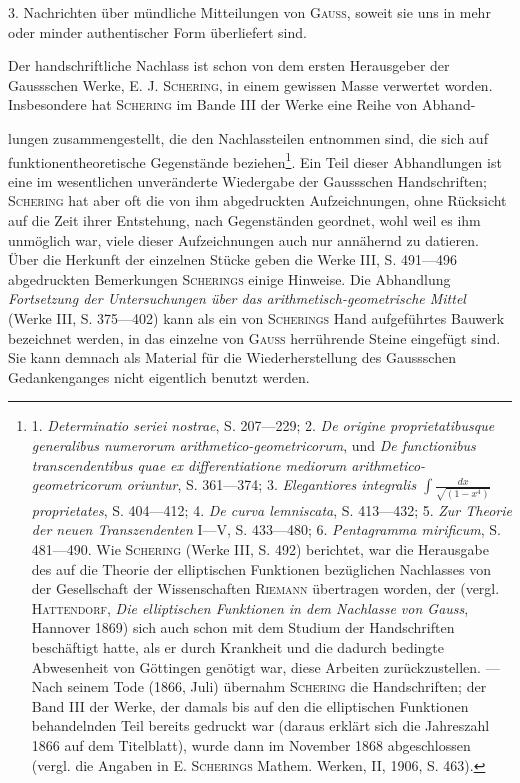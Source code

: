 3. Nachrichten über mündliche Mitteilungen von \textsc{Gauss}, soweit sie uns
in mehr oder minder authentischer Form überliefert sind.

Der handschriftliche Nachlass ist schon von dem ersten Herausgeber der
Gaussschen Werke, E. J. \textsc{Schering}, in einem gewissen Masse verwertet worden.
Insbesondere hat \textsc{Schering} im Bande III der Werke eine Reihe von Abhand-\par
\clearpage{}
\noindent lungen zusammengestellt, die den Nachlassteilen entnommen sind, die sich
auf funktionentheoretische Gegenstände beziehen\footnote{1. \textit{Determinatio seriei nostrae}, S. 207—229; 2. \textit{De origine proprietatibusque generalibus numerorum arithmetico-geometricorum}, und \textit{De functionibus transcendentibus quae ex differentiatione mediorum arithmetico-geometricorum oriuntur}, S. 361—374; 3. \textit{Elegantiores integralis \(\displaystyle\int\frac{dx}{\sqrt{(1-x^4)}}\) proprietates}, S. 404—412; 4. \textit{De curva lemniscata}, S. 413—432; 5. \textit{Zur Theorie der neuen Transzendenten} I—V, S. 433—480; 6. \textit{Pentagramma mirificum}, S. 481—490. Wie \textsc{Schering} (Werke III, S. 492) berichtet, war die Herausgabe des auf die Theorie der elliptischen Funktionen bezüglichen Nachlasses von der Gesellschaft der Wissenschaften \textsc{Riemann} übertragen worden, der (vergl. \textsc{Hattendorf}, \textit{Die elliptischen Funktionen in dem Nachlasse von Gauss}, Hannover 1869) sich auch schon mit dem Studium der Handschriften beschäftigt hatte, als er durch Krankheit und die dadurch bedingte Abwesenheit von Göttingen genötigt war, diese Arbeiten zurückzustellen. — Nach seinem Tode (1866, Juli) übernahm \textsc{Schering} die Handschriften; der Band III der Werke, der damals bis auf den die elliptischen Funktionen behandelnden Teil bereits gedruckt war (daraus erklärt sich die Jahreszahl 1866 auf dem Titelblatt), wurde dann im November 1868 abgeschlossen (vergl. die Angaben in E. \textsc{Scherings} Mathem. Werken, II, 1906, S. 463).}. Ein Teil dieser Abhandlungen
ist eine im wesentlichen unveränderte Wiedergabe der Gaussschen
Handschriften; \textsc{Schering} hat aber oft die von ihm abgedruckten Aufzeichnungen,
ohne Rücksicht auf die Zeit ihrer Entstehung, nach Gegenständen
geordnet, wohl weil es ihm unmöglich war, viele dieser Aufzeichnungen auch
nur annähernd zu datieren. Über die Herkunft der einzelnen Stücke geben
die Werke III, S. 491—496 abgedruckten Bemerkungen \textsc{Scherings} einige
Hinweise. Die Abhandlung \textit{Fortsetzung der Untersuchungen über das arithmetisch-geometrische Mittel}
(Werke III, S. 375—402) kann als ein von \textsc{Scherings}
Hand aufgeführtes Bauwerk bezeichnet werden, in das einzelne von \textsc{Gauss} herrührende
Steine eingefügt sind. Sie kann demnach als Material für die Wiederherstellung
des Gaussschen Gedankenganges nicht eigentlich benutzt werden.

